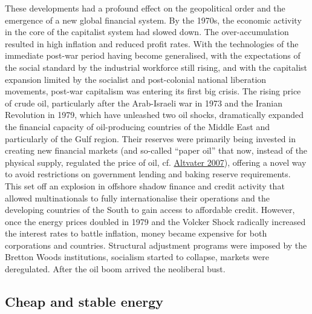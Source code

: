 \documentclass[a4paper, nobind]{templates/ociamthesis}
\begin{document}
These developments had a profound effect on the geopolitical order and the emergence of a new global financial system. By the 1970s, the economic activity in the core of the capitalist system had slowed down. The over-accumulation resulted in high inflation and reduced profit rates. With the technologies of the immediate post-war period having become generalised, with the expectations of the social standard by the industrial workforce still rising, and with the capitalist expansion limited by the socialist and post-colonial national liberation movements, post-war capitalism was entering its first big crisis. The rising price of crude oil, particularly after the Arab-Israeli war in 1973 and the Iranian Revolution in 1979, which have unleashed two oil shocks, dramatically expanded the financial capacity of oil-producing countries of the Middle East and particularly of the Gulf region. Their reserves were primarily being invested in creating new financial markets (and so-called {``paper oil''} that now, instead of the physical supply, regulated the price of oil, cf. \protect\hyperlink{ref-altvater_social_2007}{Altvater 2007}), offering a novel way to avoid restrictions on government lending and baking reserve requirements. This set off an explosion in offshore shadow finance and credit activity that allowed multinationals to fully internationalise their operations and the developing countries of the South to gain access to affordable credit. However, once the energy prices doubled in 1979 and the Volcker Shock radically increased the interest rates to battle inflation, money became expensive for both corporations and countries. Structural adjustment programs were imposed by the Bretton Woods institutions, socialism started to collapse, markets were deregulated. After the oil boom arrived the neoliberal bust.

\hypertarget{cheap-and-stable-energy}{%
\subsection{Cheap and stable energy}\label{cheap-and-stable-energy}}
\end{document}
